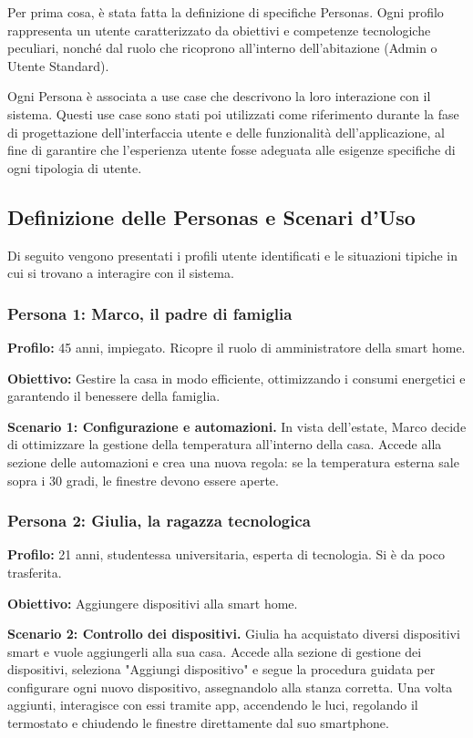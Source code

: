 \documentclass[a4paper,12pt]{article}
\begin{document}
Per prima cosa, è stata fatta la definizione di specifiche Personas. Ogni profilo rappresenta un utente caratterizzato da obiettivi e competenze tecnologiche peculiari, nonché dal ruolo che ricoprono all'interno dell'abitazione (Admin o Utente Standard).

Ogni Persona è associata a use case che descrivono la loro interazione con il sistema. Questi use case sono stati poi utilizzati come riferimento durante la fase di progettazione dell'interfaccia utente e delle funzionalità dell'applicazione, al fine di garantire che l'esperienza utente fosse adeguata alle esigenze specifiche di ogni tipologia di utente.

\subsection{Definizione delle Personas e Scenari d'Uso}
Di seguito vengono presentati i profili utente identificati e le situazioni tipiche in cui si trovano a interagire con il sistema.

\subsubsection{Persona 1: Marco, il padre di famiglia}

\textbf{Profilo:} 45 anni, impiegato. Ricopre il ruolo di amministratore della smart home.

\noindent\textbf{Obiettivo:} Gestire la casa in modo efficiente, ottimizzando i consumi energetici e garantendo il benessere della famiglia.

\noindent\textbf{Scenario 1: Configurazione e automazioni.} In vista dell'estate, Marco decide di ottimizzare la gestione della temperatura all'interno della casa. Accede alla sezione delle automazioni e crea una nuova regola: se la temperatura esterna sale sopra i 30 gradi, le finestre devono essere aperte. 

\subsubsection{Persona 2: Giulia, la ragazza tecnologica}

\textbf{Profilo:} 21 anni, studentessa universitaria, esperta di tecnologia. Si è da poco trasferita.

\noindent\textbf{Obiettivo:} Aggiungere dispositivi alla smart home.

\noindent\textbf{Scenario 2: Controllo dei dispositivi.} Giulia ha acquistato diversi dispositivi smart e vuole aggiungerli alla sua casa. Accede alla sezione di gestione dei dispositivi, seleziona "Aggiungi dispositivo" e segue la procedura guidata per configurare ogni nuovo dispositivo, assegnandolo alla stanza corretta. Una volta aggiunti, interagisce con essi tramite app, accendendo le luci, regolando il termostato e chiudendo le finestre direttamente dal suo smartphone.
\end{document}
